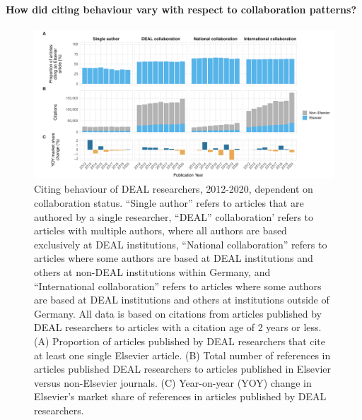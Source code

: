 \documentclass[
]{article}
\begin{document}
\hypertarget{how-did-citing-behaviour-vary-with-respect-to-collaboration-patterns}{%
\paragraph{How did citing behaviour vary with respect to collaboration patterns?}\label{how-did-citing-behaviour-vary-with-respect-to-collaboration-patterns}}



\begin{figure}

{\centering \includegraphics{analysis_files/figure-latex/references-publisher-year-collaboration-1} 

}

\caption{Citing behaviour of DEAL researchers, 2012-2020, dependent on collaboration status. ``Single author'' refers to articles that are authored by a single researcher, ``DEAL'' collaboration' refers to articles with multiple authors, where all authors are based exclusively at DEAL institutions, ``National collaboration'' refers to articles where some authors are based at DEAL institutions and others at non-DEAL institutions within Germany, and ``International collaboration'' refers to articles where some authors are based at DEAL institutions and others at institutions outside of Germany. All data is based on citations from articles published by DEAL researchers to articles with a citation age of 2 years or less. (A) Proportion of articles published by DEAL researchers that cite at least one single Elsevier article. (B) Total number of references in articles published DEAL researchers to articles published in Elsevier versus non-Elsevier journals. (C) Year-on-year (YOY) change in Elsevier's market share of references in articles published by DEAL researchers.}\label{fig:references-publisher-year-collaboration}
\end{figure}
\end{document}

